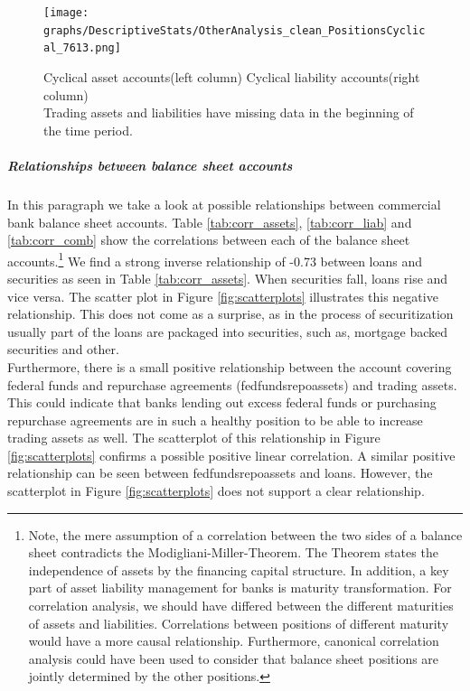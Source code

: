 \documentclass[12pt, a4paper]{article} %
\begin{document}
\begin{figure}[H]
\begin{minipage}{\textwidth}
\texttt{[image: graphs/DescriptiveStats/OtherAnalysis\_clean\_PositionsCyclical\_7613.png]}
\caption[1]{Cyclical asset accounts(left column) \hspace{2cm} Cyclical liability accounts(right column)\\
 Trading assets and liabilities have missing data in the beginning of the time period.}
\label{fig:positions}
\end{minipage}
\end{figure}

\subparagraph{Relationships between balance sheet accounts}
In this paragraph we take a look at possible relationships between commercial bank balance sheet accounts.
Table \ref{tab:corr_assets}, \ref{tab:corr_liab} and \ref{tab:corr_comb} show the correlations between each of the balance sheet accounts.\footnote{Note, the mere assumption of a correlation between the two sides of a balance sheet contradicts the Modigliani-Miller-Theorem. The Theorem states the independence of assets by the financing capital structure. In addition, a key part of asset liability management for banks is maturity transformation. For correlation analysis, we should have differed between the different maturities of assets and liabilities. Correlations between positions of different maturity would have a more causal relationship. Furthermore, canonical correlation analysis could have been used to consider that balance sheet positions are jointly determined by the other positions.}
We find a strong inverse relationship of -0.73 between loans and securities as seen in Table \ref{tab:corr_assets}. When securities fall, loans rise and vice versa. The scatter plot in Figure \ref{fig:scatterplots} illustrates this negative relationship. This does not come as a surprise, as in the process of securitization usually part of the loans are packaged into securities, such as, mortgage backed securities and other.\\
Furthermore, there is a small positive relationship between the account covering federal funds and repurchase agreements (fedfundsrepoassets) and trading assets. This could indicate that banks lending out excess federal funds or purchasing repurchase agreements are in such a healthy position to be able to increase trading assets as well. The scatterplot of this relationship in Figure \ref{fig:scatterplots} confirms a possible positive linear correlation. A similar positive relationship can be seen between fedfundsrepoassets and loans. However, the scatterplot in Figure \ref{fig:scatterplots} does not support a clear relationship.\\
\end{document}
